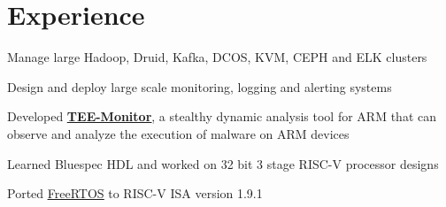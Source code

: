 \documentclass[]{illustris-resume-openfont}
\newcommand{\myul}[2][black]{\setulcolor{#1}\ul{#2}\setulcolor{black}}
\begin{document}
\begin{minipage}[t]{0.66\textwidth} 


\section{Experience}

\vspace{\topsep} %
\begin{tightemize}\item Manage large Hadoop, Druid, Kafka, DCOS, KVM, CEPH and ELK clusters
\item Design and deploy large scale monitoring, logging and alerting systems
\end{tightemize}
\sectionsep

\begin{tightemize}\item Developed \textbf{\href{https://summerofcode.withgoogle.com/archive/2018/projects/6284668475277312/}{\color{blue} \myul[blue] {TEE-Monitor}}}, a stealthy dynamic analysis tool for ARM that can observe and analyze the execution of malware on ARM devices
\end{tightemize}
\sectionsep

\begin{tightemize}\item Learned Bluespec HDL and worked on 32 bit 3 stage RISC-V processor designs
\item Ported \href{https://github.com/illustris/freertos-riscv}{\color{blue} \myul[blue] {FreeRTOS}} to RISC-V ISA version 1.9.1
\end{tightemize}



\end{minipage}
\end{document}
